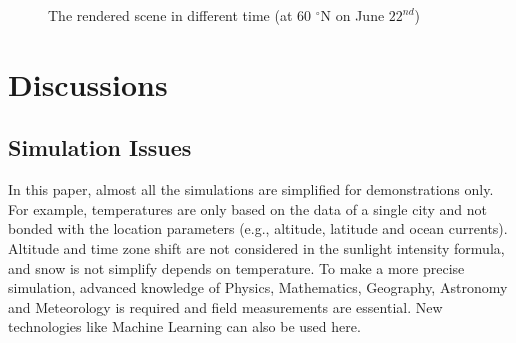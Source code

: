 \documentclass{article}
\begin{document}
\begin{figure}[h]
  \hfill
  \hfill

  \caption{The rendered scene in different time (at 60 $^{\circ}$N on June \(22^{nd}\))}
  \label{fig:L60N}
\end{figure}

\section{Discussions}

\subsection{Simulation Issues}
In this paper, almost all the simulations are simplified for demonstrations only. For example, temperatures are only based on the data
of a single city and not bonded with the location parameters (e.g., altitude, latitude and ocean currents). Altitude and time zone
shift are not considered in the sunlight intensity formula, and snow is not simplify depends on temperature. To make a more precise
simulation, advanced knowledge of Physics, Mathematics, Geography, Astronomy and Meteorology is required and field measurements are
essential. New technologies like Machine Learning can also be used here.
\end{document}
